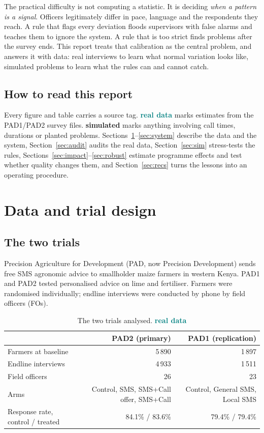 \documentclass[11pt,a4paper]{article}
\newcommand{\simd}{\textcolor{amber}{\sffamily\bfseries simulated}}
\newcommand{\real}{\textcolor{teal}{\sffamily\bfseries real data}}
\begin{document}
The practical difficulty is not computing a statistic. It is deciding \emph{when a pattern is a signal}. Officers legitimately differ in pace, language and the respondents they reach. A rule that flags every deviation floods supervisors with false alarms and teaches them to ignore the system. A rule that is too strict finds problems after the survey ends. This report treats that calibration as the central problem, and answers it with data: real interviews to learn what normal variation looks like, simulated problems to learn what the rules can and cannot catch.

\subsection*{How to read this report}
Every figure and table carries a source tag. \real{} marks estimates from the PAD1/PAD2 survey files. \simd{} marks anything involving call times, durations or planted problems. Sections~\ref{sec:data}--\ref{sec:system} describe the data and the system, Section~\ref{sec:audit} audits the real data, Section~\ref{sec:sim} stress-tests the rules, Sections~\ref{sec:impact}--\ref{sec:robust} estimate programme effects and test whether quality changes them, and Section~\ref{sec:recs} turns the lessons into an operating procedure.

\section{Data and trial design}\label{sec:data}
\subsection{The two trials}
Precision Agriculture for Development (PAD, now Precision Development) sends free SMS agronomic advice to smallholder maize farmers in western Kenya. PAD1 and PAD2 tested personalised advice on lime and fertiliser. Farmers were randomised individually; endline interviews were conducted by phone by field officers (FOs).

\begin{table}[H]\centering\small\setlength{\tabcolsep}{6pt}
\begin{tabular}{lrr}\toprule & PAD2 (primary) & PAD1 (replication)\\\midrule
Farmers at baseline & 5\,890 & 1\,897\\ Endline interviews & 4\,933 & 1\,511\\ Field officers & 26 & 23\\
Arms & Control, SMS, SMS+Call offer, SMS+Call & Control, General SMS, Local SMS\\
Response rate, control / treated & 84.1\% / 83.6\% & 79.4\% / 79.4\%\\\bottomrule\end{tabular}
\caption{The two trials analysed. \real}\end{table}
\end{document}
